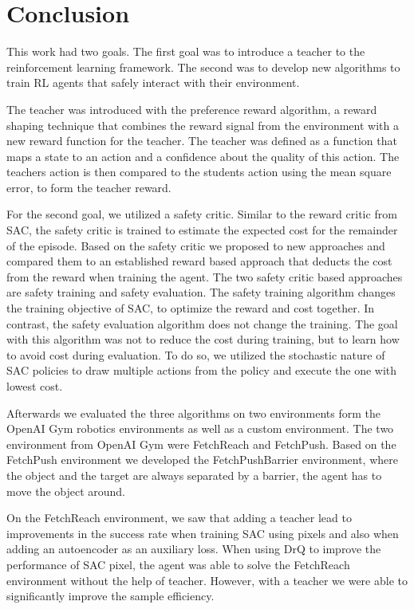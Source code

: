\chapter{Conclusion}
\label{ch:Conclusion}

This work had two goals. The first goal was to introduce a teacher to the reinforcement learning framework. The second was to develop new algorithms to train RL agents that safely interact with their environment.

The teacher was introduced with the preference reward algorithm, a reward shaping technique that combines the reward signal from the environment with a new reward function for the teacher. The teacher was defined as a function that maps a state to an action and a confidence about the quality of this action. The teachers action is then compared to the students action using the mean square error, to form the teacher reward. 

For the second goal, we utilized a safety critic. Similar to the reward critic from SAC, the safety critic is trained to estimate the expected cost for the remainder of the episode. Based on the safety critic we proposed to new approaches and compared them to an established reward based approach that deducts the cost from the reward when training the agent. The two safety critic based approaches are safety training and safety evaluation. The safety training algorithm changes the training objective of SAC, to optimize the reward and cost together. In contrast, the safety evaluation algorithm does not change the training. The goal with this algorithm was not to reduce the cost during training, but to learn how to avoid cost during evaluation. To do so, we utilized the stochastic nature of SAC policies to draw multiple actions from the policy and execute the one with lowest cost.

Afterwards we evaluated the three algorithms on two environments form the OpenAI Gym robotics environments as well as a custom environment. The two environment from OpenAI Gym were FetchReach and FetchPush. Based on the FetchPush environment we developed the FetchPushBarrier environment, where the object and the target are always separated by a barrier, the agent has to move the object around.

On the FetchReach environment, we saw that adding a teacher lead to improvements in the success rate when training SAC using pixels and also when adding an autoencoder as an auxiliary loss. When using DrQ to improve the performance of SAC pixel, the agent was able to solve the FetchReach environment without the help of teacher. However, with a teacher we were able to significantly improve the sample efficiency.

